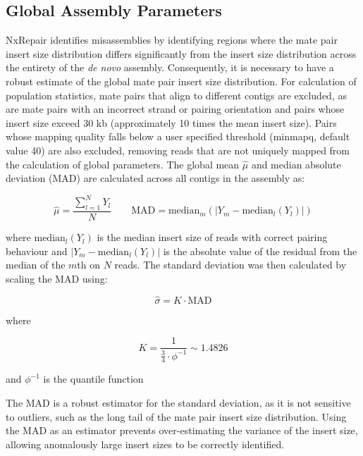 \subsection{Global Assembly Parameters}
NxRepair identifies misassemblies by identifying regions where the mate pair insert size distribution differs significantly from the insert size distribution across the entirety of the \textit{de novo} assembly. Consequently, it is necessary to have a robust estimate of the global mate pair insert size distribution. For calculation of population statistics, mate pairs that align to different contigs are excluded, as are mate pairs with an incorrect strand or pairing orientation and pairs whose insert size exceed 30 kb (approximately 10 times the mean insert size). Pairs whose mapping quality falls below a user specified threshold (minmapq, default value 40) are also excluded, removing reads that are not uniquely mapped from the calculation of global parameters. The global mean $\hat{\mu}$ and median absolute deviation ($\text{MAD}$) are calculated across all contigs in the assembly as:

\begin{equation}
\hat{\mu} = \frac{\sum_{l=1}^N Y_l}{N} \qquad \text{MAD} = \text{median}_m(|Y_m - \text{median}_l(Y_l)|)
\label{eq:global}
\end{equation}

where $\text{median}_l(Y_l)$ is the median insert size of reads with correct pairing behaviour and $|Y_m - \text{median}_l(Y_l)|$ is the absolute value of the residual from the median of the $m$th on $N$ reads. The standard deviation was then calculated by scaling the MAD using:

\begin{equation}
\hat{\sigma} = K \cdot \text{MAD}
\label{eq:mad_to_sigma}
\end{equation}

where 

\begin{equation}
K = \frac{1}{\frac{3}{4} \cdot \phi^{-1}} \sim 1.4826
\label{eq:k_scale}
\end{equation}

and $\phi^{-1}$ is the quantile function~\cite{Leys2013}

The $\text{MAD}$ is a robust estimator for the standard deviation, as it is not sensitive to outliers, such as the long tail of the mate pair insert size distribution. Using the MAD as an estimator prevents over-estimating the variance of the insert size, allowing anomalously large insert sizes to be correctly identified.

